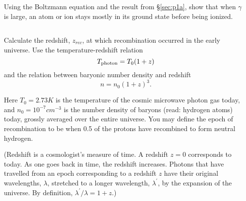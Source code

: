 \documentclass[11pt]{article}
\begin{document}
\subsection{}
Using the Boltzmann equation and the result from \S\ref{sec:p1a}, show that when $\gamma$
is large, an atom or ion stays mostly in its ground state before being ionized.

\subsection{}
Calculate the redshift, $z_{rec}$, at which recombination occurred 
in the early universe. Use the temperature-redshift relation
\begin{equation}
T_{\rm photon} = T_0(1+z) 
\end{equation}
and the relation between baryonic number density and redshift
\begin{equation}
n=n_0(1 + z)^3.
\end{equation}

Here $T_0 = 2.73K$ is the temperature of the cosmic microwave photon gas today,
and $n_0 = 10^{-7} cm^{-3}$ is the number density of baryons (read: hydrogen atoms)
today, grossly averaged over the entire universe. You may define the epoch of
recombination to be when 0.5 of the protons have recombined to form neutral
hydrogen.  

(Redshift is a cosmologist’s measure of time. A redshift $z = 0$
corresponds to today. As one goes back in time, the redshift increases. Photons
that have travelled from an epoch corresponding to a redshift $z$ have their
original wavelengths, $\lambda$, stretched to a longer wavelength, $\lambda^\prime$, by the expansion
of the universe. By definition, $\lambda^\prime/\lambda=1+z$.)
\end{document}
